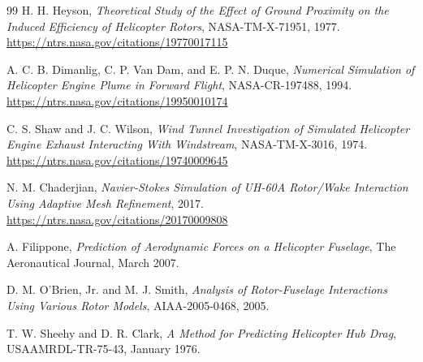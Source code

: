 \documentclass[12pt,a4paper]{article}
\begin{document}
\begin{thebibliography}{99}
H. H. Heyson,
\textit{Theoretical Study of the Effect of Ground Proximity on the Induced Efficiency of Helicopter Rotors},
NASA-TM-X-71951, 1977.
\url{https://ntrs.nasa.gov/citations/19770017115}

A. C. B. Dimanlig, C. P. Van Dam, and E. P. N. Duque,
\textit{Numerical Simulation of Helicopter Engine Plume in Forward Flight},
NASA-CR-197488, 1994.
\url{https://ntrs.nasa.gov/citations/19950010174}

C. S. Shaw and J. C. Wilson,
\textit{Wind Tunnel Investigation of Simulated Helicopter Engine Exhaust Interacting With Windstream},
NASA-TM-X-3016, 1974.
\url{https://ntrs.nasa.gov/citations/19740009645}

N. M. Chaderjian,
\textit{Navier-Stokes Simulation of UH-60A Rotor/Wake Interaction Using Adaptive Mesh Refinement},
2017.
\url{https://ntrs.nasa.gov/citations/20170009808}

A. Filippone,
\textit{Prediction of Aerodynamic Forces on a Helicopter Fuselage},
The Aeronautical Journal, March 2007.

D. M. O'Brien, Jr. and M. J. Smith,
\textit{Analysis of Rotor-Fuselage Interactions Using Various Rotor Models},
AIAA-2005-0468, 2005.

T. W. Sheehy and D. R. Clark,
\textit{A Method for Predicting Helicopter Hub Drag},
USAAMRDL-TR-75-43, January 1976.

\end{thebibliography}
\end{document}
